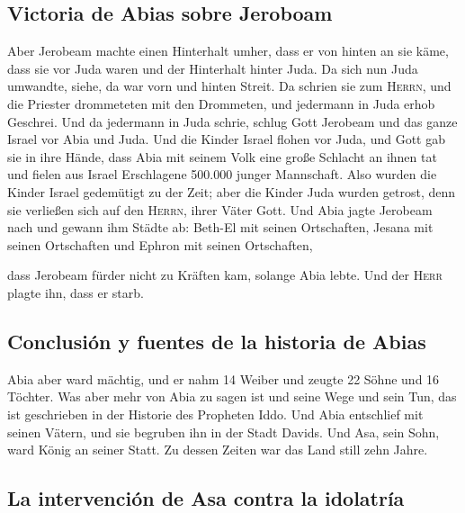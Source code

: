 \hypertarget{victoria-de-abias-sobre-jeroboam}{%
\subsection{Victoria de Abias sobre
Jeroboam}\label{victoria-de-abias-sobre-jeroboam}}

 Aber Jerobeam machte einen Hinterhalt umher, dass er von
hinten an sie käme, dass sie vor Juda waren und der Hinterhalt hinter
Juda.  Da sich nun Juda umwandte, siehe, da war vorn und
hinten Streit. Da schrien sie zum \textsc{Herrn}, und die Priester
drommeteten mit den Drommeten,  und jedermann in Juda
erhob Geschrei. Und da jedermann in Juda schrie, schlug Gott Jerobeam
und das ganze Israel vor Abia und Juda.  Und die Kinder
Israel flohen vor Juda, und Gott gab sie in ihre Hände, 
dass Abia mit seinem Volk eine große Schlacht an ihnen tat und fielen
aus Israel Erschlagene 500.000 junger Mannschaft.  Also
wurden die Kinder Israel gedemütigt zu der Zeit; aber die Kinder Juda
wurden getrost, denn sie verließen sich auf den \textsc{Herrn}, ihrer
Väter Gott.  Und Abia jagte Jerobeam nach und gewann ihm
Städte ab: Beth-El mit seinen Ortschaften, Jesana mit seinen Ortschaften
und Ephron mit seinen Ortschaften,

 dass Jerobeam fürder nicht zu Kräften kam, solange Abia
lebte. Und der \textsc{Herr} plagte ihn, dass er starb.

\hypertarget{conclusiuxf3n-y-fuentes-de-la-historia-de-abias}{%
\subsection{Conclusión y fuentes de la historia de
Abias}\label{conclusiuxf3n-y-fuentes-de-la-historia-de-abias}}

 Abia aber ward mächtig, und er nahm 14 Weiber und zeugte
22 Söhne und 16 Töchter.  Was aber mehr von Abia zu sagen
ist und seine Wege und sein Tun, das ist geschrieben in der Historie des
Propheten Iddo.  Und Abia entschlief mit seinen Vätern,
und sie begruben ihn in der Stadt Davids. Und Asa, sein Sohn, ward König
an seiner Statt. Zu dessen Zeiten war das Land still zehn Jahre.

\hypertarget{la-intervenciuxf3n-de-asa-contra-la-idolatruxeda}{%
\subsection{La intervención de Asa contra la
idolatría}\label{la-intervenciuxf3n-de-asa-contra-la-idolatruxeda}}


